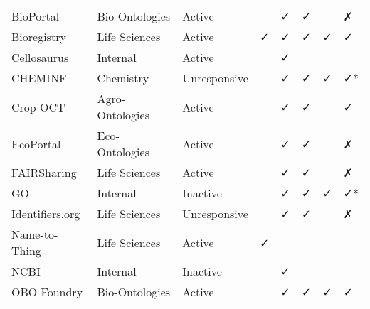 \begin{table}
\begin{tabular}{llllllll}
      BioPortal &  Bio-Ontologies &       Active &                           &                      ✓ &                              ✓ &                             &                      ✗ \\
    Bioregistry &   Life Sciences &       Active &                         ✓ &                      ✓ &                              ✓ &                           ✓ &                      ✓ \\
    Cellosaurus &        Internal &       Active &                           &                      ✓ &                                &                             &                        \\
        CHEMINF &       Chemistry & Unresponsive &                           &                      ✓ &                              ✓ &                           ✓ &                     ✓* \\
       Crop OCT & Agro-Ontologies &       Active &                           &                      ✓ &                              ✓ &                             &                      ✓ \\
      EcoPortal &  Eco-Ontologies &       Active &                           &                      ✓ &                              ✓ &                             &                      ✗ \\
    FAIRSharing &   Life Sciences &       Active &                           &                      ✓ &                              ✓ &                             &                      ✗ \\
             GO &        Internal &     Inactive &                           &                      ✓ &                              ✓ &                           ✓ &                     ✓* \\
Identifiers.org &   Life Sciences & Unresponsive &                           &                      ✓ &                              ✓ &                             &                      ✗ \\
  Name-to-Thing &   Life Sciences &       Active &                         ✓ &                        &                                &                             &                        \\
           NCBI &        Internal &     Inactive &                           &                      ✓ &                                &                             &                        \\
    OBO Foundry &  Bio-Ontologies &       Active &                           &                      ✓ &                              ✓ &                           ✓ &                      ✓ \\

\end{tabular}
\end{table}
